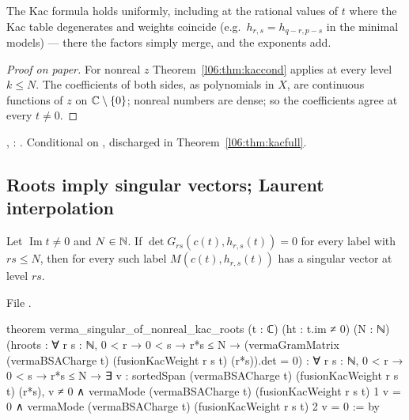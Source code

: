 \begin{physics}
The Kac formula holds uniformly, including at the rational values of $t$ where the Kac table
degenerates and weights coincide (e.g.\ $h_{r,s} = h_{q-r,p-s}$ in the minimal models) --- there the factors
simply merge, and the exponents add.
\end{physics}

\begin{proof}[Proof on paper]
For nonreal $z$ Theorem~\ref{l06:thm:kaccond} applies at every level $k\le N$. The coefficients of both
sides, as polynomials in $X$, are continuous functions of $z$ on ${\mathbb{C}}\setminus\{0\}$; nonreal numbers are
dense; so the coefficients agree at every $t\ne0$.
\end{proof}

\begin{status}
\allowbreak{}\allowbreak{}, \allowbreak{}\allowbreak{}\allowbreak{}\allowbreak{}\allowbreak{}:
\lean{[propext, Classical.}\allowbreak{}\allowbreak\lean{sound]}. Conditional on , discharged in
Theorem~\ref{l06:thm:kacfull}.
\end{status}

\subsection{Roots imply singular vectors; Laurent interpolation}

\begin{theorem}\label{l06:thm:bootstrap}
Let $\operatorname{Im}t\ne0$ and $N\in{\mathbb{N}}$. If $\det G_{rs}(c(t),h_{r,s}(t)) = 0$ for every label with $rs\le N$,
then for every such label $M(c(t),h_{r,s}(t))$ has a singular vector at level $rs$.
\end{theorem}

File .
\begin{leancode}
theorem verma_singular_of_nonreal_kac_roots (t : ℂ) (ht : t.im ≠ 0) (N : ℕ)
    (hroots : ∀ r s : ℕ, 0 < r → 0 < s → r*s ≤ N →
      (vermaGramMatrix (vermaBSACharge t) (fusionKacWeight r s t) (r*s)).det = 0) :
    ∀ r s : ℕ, 0 < r → 0 < s → r*s ≤ N →
      ∃ v : sortedSpan (vermaBSACharge t) (fusionKacWeight r s t) (r*s),
        v ≠ 0 ∧ vermaMode (vermaBSACharge t) (fusionKacWeight r s t) 1 v = 0 ∧
          vermaMode (vermaBSACharge t) (fusionKacWeight r s t) 2 v = 0 := by
\end{leancode}

